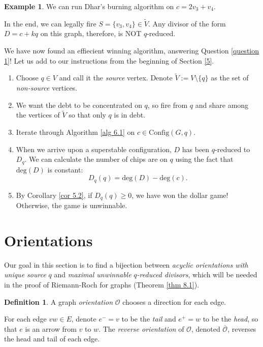 \documentclass[openany, amssymb, psamsfonts]{amsart}
\theoremstyle{definition}
\newtheorem{defn}{Definition}[section]
\newtheorem{exmp}{Example}[section]
\numberwithin{equation}{section}
\begin{document}
\begin{exmp}
We can run Dhar's burning algorithm on $c=2v_3+v_4$. 
\begin{center}
    
\end{center}
In the end, we can legally fire $S=\{v_3,v_4\}\in \tilde{V}$. Any divisor of the form $D=c+kq$ on this graph, therefore, is NOT $q$-reduced.
\end{exmp}

We have now found an effiecient winning algorithm, answering Question \ref{question 1}! Let us add to our instructions from the beginning of Section \ref{5}. 

\begin{enumerate}
    \item Choose $q\in V$ and call it the \textit{source} vertex. Denote $\tilde{V}:=V\setminus \{q\}$ as the set of \textit{non-source} vertices.
    \item We want the debt to be concentrated on $q$, so fire from $q$ and share among the vertices of $\tilde{V}$ so that only $q$ is in debt.
    \item Iterate through Algorithm \ref{alg 6.1} on $c\in \text{Config}(G,q)$.
    \item When we arrive upon a superstable configuration, $D$ has been $q$-reduced to $D_q$. We can calculate the number of chips are on $q$ using the fact that $\text{deg}(D)$ is constant:
    \[D_q(q)=\text{deg}(D)-\text{deg}(c).\]
    \item By Corollary \ref{cor 5.2}, if $D_q(q)\geq 0$, we have won the dollar game! Otherwise, the game is unwinnable.
\end{enumerate}





\section{Orientations}
\label{7}

Our goal in this section is to find a bijection between \textit{acyclic orientations with unique source} $q$ and \textit{maximal unwinnable }$q$\textit{-reduced divisors}, which will be needed in the proof of Riemann-Roch for graphs (Theorem \ref{thm 8.1}).

\begin{defn}
A graph \textit{orientation} $\mathcal{O}$ chooses a direction for each edge.
\end{defn}

For each edge $vw\in E$, denote $e^-=v$ to be the \textit{tail} and $e^+=w$ to be the \textit{head}, so that $e$ is an arrow from $v$ to $w$. The \textit{reverse orientation} of $\mathcal{O}$, denoted $\overline{\mathcal{O}}$, reverses the head and tail of each edge.
\end{document}
